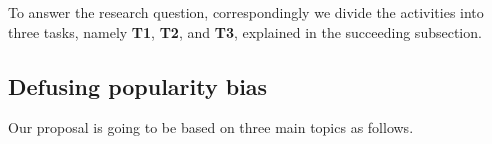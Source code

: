 To answer the research question, correspondingly we divide the activities into three tasks, namely \textbf{T1}, \textbf{T2}, and \textbf{T3}, %
explained in the succeeding subsection.






\subsection{Defusing popularity bias}



Our proposal is going to be based on three main topics as follows.


